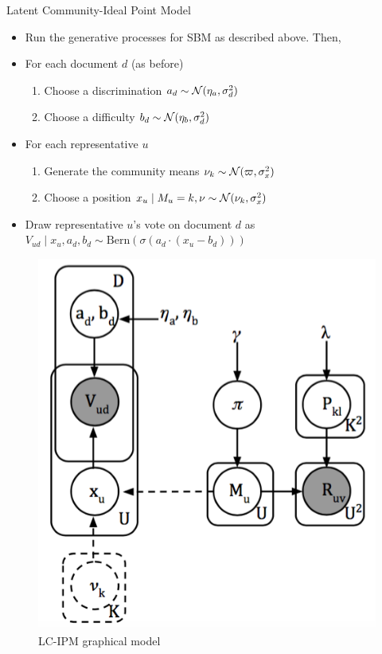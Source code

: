\documentclass{article}
\begin{document}
\newpage


\noindent Latent Community-Ideal Point Model%
\begin{itemize}
\item Run the generative processes for SBM as described above. Then, %
\item For each document $d$ (as before)
\begin{enumerate}
\item Choose a discrimination $a_d \sim \mathcal{N}(\eta_{a},\sigma^2_d)$ %
\item Choose a difficulty $b_d \sim \mathcal{N}(\eta_{b},\sigma^2_d)$
\end{enumerate}
\item For each representative $u$
\begin{enumerate}
\item Generate the community means $\nu_k\sim \mathcal{N}(\varpi, \sigma^2_x)$
\item Choose a position $x_u\mid M_u = k, \nu \sim \mathcal{N}(\nu_k,\sigma^2_x)$
\end{enumerate}
\item Draw representative $u$'s vote on document $d$ as $V_{ud} \mid x_u, a_d, b_d \sim \text{Bern}(\sigma(a_d\cdot(x_u-b_d)))$
\end{itemize}



\begin{figure}[h]
  \centering
  \includegraphics[scale=.4]{lcipm2}
  \caption{LC-IPM graphical model}
\end{figure}
\end{document}
